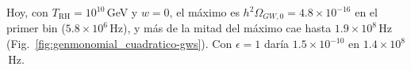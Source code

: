             Hoy, con $T_{\text{RH}} = 10^{10}$\,GeV y $w = 0$, el máximo es $h^2\Omega_{GW,0} = 4.8 \times 10^{-16}$ en el primer bin ($5.8 \times 10^6$\,Hz), y más de la mitad del máximo cae hasta $1.9 \times 10^8$\,Hz (Fig.~\ref{fig:genmonomial_cuadratico-gws}). Con $\epsilon = 1$ daría $1.5 \times 10^{-10}$ en $1.4 \times 10^8$\,Hz.
